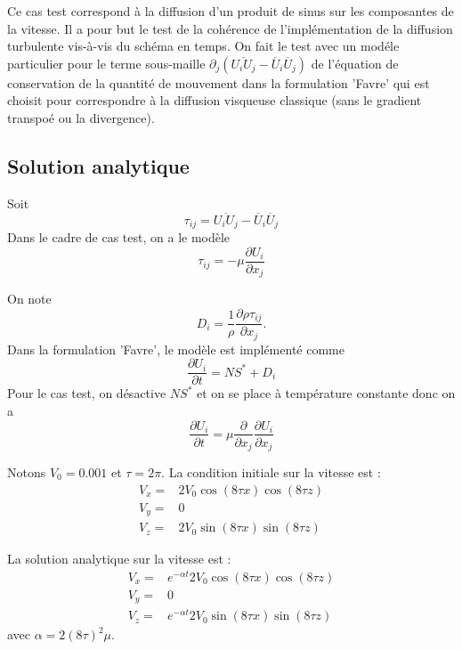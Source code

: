 Ce cas test correspond \`a la diffusion d'un produit de sinus sur les composantes de la vitesse. Il a pour but le test de la coh\'erence de l'impl\'ementation de la diffusion turbulente vis-\`a-vis du sch\'ema en temps. On fait le test avec un mod\'ele particulier pour le terme sous-maille $\partial_j\left(\overline{U_i U_j} - \overline{U}_i\overline{U}_j\right)$ de l'\'equation de conservation de la quantit\'e de mouvement dans la formulation 'Favre' qui est choisit pour correspondre \`a la diffusion visqueuse classique (sans le gradient transpo\'e ou la divergence).

\subsection{Solution analytique}

Soit
\begin{equation}
\tau_{ij} = \overline{U_i U_j} - \overline{U}_i\overline{U}_j
\end{equation}
Dans le cadre de cas test, on a le mod\`ele
\begin{equation}
\tau_{ij} = - \mu \frac{\partial U_i}{\partial x_j}
\end{equation}

On note
\begin{equation}
D_i = \frac{1}{\rho} \frac{\partial \rho \tau_{ij}}{\partial x_j}.
\end{equation}
Dans la formulation 'Favre', le mod\`ele est impl\'ement\'e comme
\begin{equation}
\frac{\partial U_{i}}{\partial t} = NS^* + D_i
\end{equation}
Pour le cas test, on d\'esactive $NS^*$ et on se place \`a temp\'erature constante donc on a
\begin{equation}
\frac{\partial U_{i}}{\partial t} = \mu \frac{\partial}{\partial x_j} \frac{\partial U_i}{\partial x_j}
\end{equation}

Notons $V_0 = 0.001$ et $\tau=2\pi$.
La condition initiale sur la vitesse est :
\begin{align*}
V_x ={}& 2 V_0 \cos(8 \tau x) \cos(8 \tau z) \\
V_y ={}& 0 \\
V_z ={}& 2 V_0 \sin(8 \tau x) \sin(8 \tau z)
\end{align*}

La solution analytique sur la vitesse est :
\begin{align*}
V_x ={}& e^{-\alpha t} 2 V_0 \cos(8 \tau x) \cos(8 \tau z) \\
V_y ={}& 0 \\
V_z ={}& e^{-\alpha t} 2 V_0 \sin(8 \tau x) \sin(8 \tau z)
\end{align*}
avec $\alpha = 2 (8\tau)^2 \mu$.

